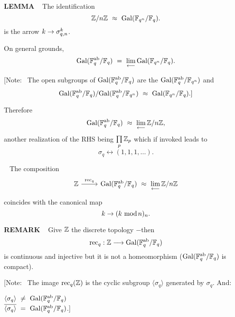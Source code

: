 \begin{x}{\small\bf LEMMA} \ %
The identification
\[
\mathbb{Z}/n\mathbb{Z} \ \approx \ \text{Gal}(\mathbb{F}_{q^n} / \mathbb{F}_q). 
\]
is the arrow $k \rightarrow \sigma_{q,n}^k$.
\end{x}

\vspace{0.1cm}

On general grounds, 
\[
\text{Gal}(\mathbb{F}_q^{\text{ab}} / \mathbb{F}_q) \ = \ \lim\limits_{\longleftarrow} \text{Gal}(\mathbb{F}_{q^n} / \mathbb{F}_q).
\]

[Note: \  The open subgroups of $\text{Gal}(\mathbb{F}_q^{\text{ab}} / \mathbb{F}_q)$ are the $\text{Gal}(\mathbb{F}_{q}^{\text{ab}} / \mathbb{F}_{q^n})$ and 
\[
\text{Gal}(\mathbb{F}_q^{\text{ab}} / \mathbb{F}_q) /  \text{Gal}(\mathbb{F}_q^{\text{ab}} / \mathbb{F}_{q^n}) \ \approx \ \text{Gal}(\mathbb{F}_{q^n} / \mathbb{F}_q).]
\]

Therefore 
\[
\Gal(\F_q^\ab / \F_q)  \ \approx  \ \lim\limits_{\lla} \Z / n\Z,
\]
another realization of the RHS being $\prod\limits_p \mathbb{Z}_p$ which if invoked leads to 
\[
\sigma_q \longleftrightarrow (1, 1, 1, \ldots).
\]

\begin{x}{\small\bf {}} \ %
The composition
\[
\begin{tikzcd}[sep=small]
{\Z} \ar{rr}{\rec_q} &&{\Gal(\F_q^\ab / \F_q) \ \approx \ \lim\limits_{\lla} \Z / n\Z} 
\end{tikzcd}
\]
coincides with the canonical map 
\[
k \rightarrow (k  \ \text{mod}\hspace{0.05cm} n)_n.
\]
\end{x}

\vspace{0.2cm}

\begin{x}{\small\bf REMARK} \ %
Give $\mathbb{Z}$ the discrete topology $-$then 
\[
\text{rec}_q: \mathbb{Z} \longrightarrow \text{Gal}(\mathbb{F}_q^{\text{ab}} / \mathbb{F}_q) 
\]
is continuous and injective but it is not a homeomorphism ($\text{Gal}(\mathbb{F}_q^{\text{ab}} / \mathbb{F}_q)$ is compact).

\vspace{0.1cm}

[Note: \ 
The image $\text{rec}_q(\mathbb{Z})$ is the cyclic subgroup $\langle \sigma_q \rangle$ generated by $\sigma_q$.  And:

\vspace{0.2cm}

\qquad \textbullet \quad $\langle \sigma_q \rangle \ \neq \  \text{Gal}(\mathbb{F}_q^{\text{ab}} / \mathbb{F}_q)$\\

\qquad \textbullet \quad $\overline{\langle \sigma_q \rangle} \ = \  \text{Gal}(\mathbb{F}_q^{\text{ab}} / \mathbb{F}_q)$.]
\end{x}
\vspace{0.1cm}

